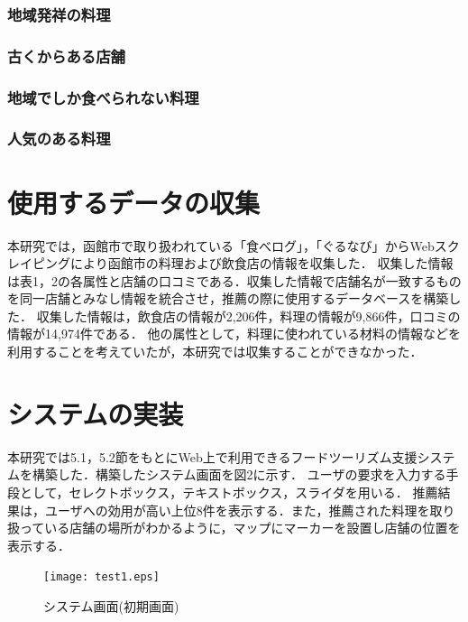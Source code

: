 \documentclass{funthesis}
\begin{document}
\subsubsection{地域発祥の料理}

\subsubsection{古くからある店舗}

\subsubsection{地域でしか食べられない料理}

\subsubsection{人気のある料理}

\section{使用するデータの収集}
本研究では，函館市で取り扱われている「食べログ」\cite{4}，「ぐるなび」\cite{5}からWebスクレイピングにより函館市の料理および飲食店の情報を収集した．
収集した情報は表1，2の各属性と店舗の口コミである．収集した情報で店舗名が一致するものを同一店舗とみなし情報を統合させ，推薦の際に使用するデータベースを構築した．
収集した情報は，飲食店の情報が2,206件，料理の情報が9,866件，口コミの情報が14,974件である．
他の属性として，料理に使われている材料の情報などを利用することを考えていたが，本研究では収集することができなかった．

\section{システムの実装}
本研究では5.1，5.2節をもとにWeb上で利用できるフードツーリズム支援システムを構築した．構築したシステム画面を図2に示す．
ユーザの要求を入力する手段として，セレクトボックス，テキストボックス，スライダを用いる．
推薦結果は，ユーザへの効用が高い上位8件を表示する．また，推薦された料理を取り扱っている店舗の場所がわかるように，マップにマーカーを設置し店舗の位置を表示する．

\begin{figure}[!p]
  \begin{center}
    \texttt{[image: test1.eps]}
    \caption{システム画面(初期画面)}
  \end{center}
\end{figure}
\end{document}
